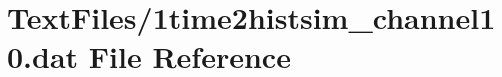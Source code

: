 \hypertarget{1time2histsim__channel10_8dat}{}\section{Text\+Files/1time2histsim\+\_\+channel10.dat File Reference}
\label{1time2histsim__channel10_8dat}
